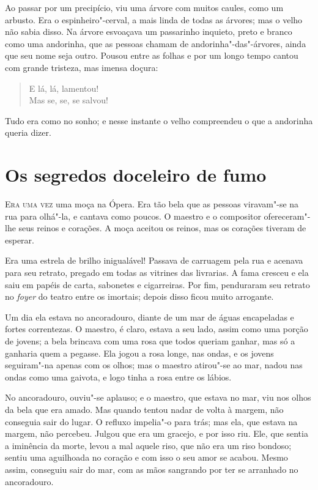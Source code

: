 Ao passar por um precipício, viu uma árvore com muitos caules, como um
arbusto. Era o espinheiro"-cerval, a mais linda de todas as árvores;
mas o velho não sabia disso. Na árvore esvoaçava um passarinho
inquieto, preto e branco como uma andorinha, que as pessoas chamam de
andorinha"-das"-árvores, ainda que seu nome seja outro. Pousou entre
as folhas e por um longo tempo cantou com grande tristeza, mas imensa
doçura:
\begin{verse}
E lá, lá, lamentou!\\
Mas se, se, se salvou!
\end{verse}

Tudo era como no sonho; e nesse instante o velho compreendeu o que a
andorinha queria dizer.

\chapter[Os segredos do celeiro de fumo]{Os segredos do\break celeiro de fumo}


\textsc{Era uma vez} uma moça na Ópera. Era tão bela que as pessoas viravam"-se
na rua para olhá"-la, e cantava como poucos. O maestro e o compositor
ofereceram"-lhe seus reinos e corações. A moça aceitou os reinos, mas
os corações tiveram de esperar.

Era uma estrela de brilho inigualável! Passava de carruagem pela rua e
acenava para seu retrato, pregado em todas as vitrines das livrarias. A
fama cresceu e ela saiu em papéis de carta, sabonetes e cigarreiras.
Por fim, penduraram seu retrato no \textit{foyer} do teatro entre os
imortais; depois disso ficou muito arrogante.

Um dia ela estava no ancoradouro, diante de um mar de águas encapeladas
e fortes correntezas. O maestro, é claro, estava a seu lado, assim como
uma porção de jovens; a bela brincava com uma rosa que todos queriam
ganhar, mas só a ganharia quem a pegasse. Ela jogou a rosa longe, nas
ondas, e os jovens seguiram"-na apenas com os olhos; mas o maestro
atirou"-se ao mar, nadou nas ondas como uma gaivota, e logo tinha a
rosa entre os lábios.

No ancoradouro, ouviu"-se aplauso; e o maestro, que estava no mar, viu
nos olhos da bela que era amado. Mas quando tentou nadar de volta à
margem, não conseguia sair do lugar. O refluxo impelia"-o para trás;
mas ela, que estava na margem, não percebeu. Julgou que era um gracejo,
e por isso riu. Ele, que sentia a iminência da morte, levou a mal
aquele riso, que não era um riso bondoso; sentiu uma aguilhoada no
coração e com isso o seu amor se acabou. Mesmo assim, conseguiu sair do
mar, com as mãos sangrando por ter se arranhado no ancoradouro.

